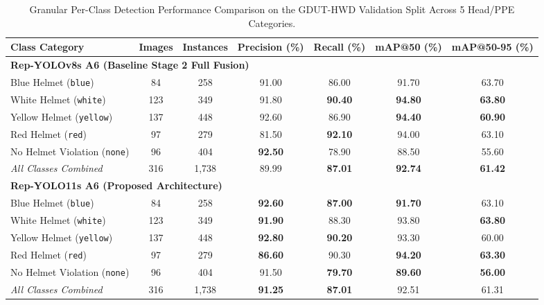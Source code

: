 \begin{table}[t]
\centering
\caption{Granular Per-Class Detection Performance Comparison on the GDUT-HWD Validation Split Across 5 Head/PPE Categories.}
\label{tab:gdut_per_class_benchmark}
\small
\begin{tabular*}{\textwidth}{@{\extracolsep{\fill}}lcccccc@{}}
\toprule
\textbf{Class Category} & \textbf{Images} & \textbf{Instances} & \textbf{Precision (\%)} & \textbf{Recall (\%)} & \textbf{mAP@50 (\%)} & \textbf{mAP@50-95 (\%)} \\
\midrule
\multicolumn{7}{l}{\textbf{Rep-YOLOv8s A6 (Baseline Stage 2 Full Fusion)}} \\
\quad Blue Helmet (\texttt{blue})    & 84  & 258 & 91.00 & 86.00 & 91.70 & 63.70 \\
\quad White Helmet (\texttt{white})  & 123 & 349 & 91.80 & \textbf{90.40} & \textbf{94.80} & \textbf{63.80} \\
\quad Yellow Helmet (\texttt{yellow})& 137 & 448 & 92.60 & 86.90 & \textbf{94.40} & \textbf{60.90} \\
\quad Red Helmet (\texttt{red})      & 97  & 279 & 81.50 & \textbf{92.10} & 94.00 & 63.10 \\
\quad No Helmet Violation (\texttt{none}) & 96 & 404 & \textbf{92.50} & 78.90 & 88.50 & 55.60 \\
\quad \textit{All Classes Combined}  & 316 & 1,738 & 89.99 & \textbf{87.01} & \textbf{92.74} & \textbf{61.42} \\
\midrule
\multicolumn{7}{l}{\textbf{Rep-YOLO11s A6 (Proposed Architecture)}} \\
\quad Blue Helmet (\texttt{blue})    & 84  & 258 & \textbf{92.60} & \textbf{87.00} & \textbf{91.70} & 63.10 \\
\quad White Helmet (\texttt{white})  & 123 & 349 & \textbf{91.90} & 88.30 & 93.80 & \textbf{63.80} \\
\quad Yellow Helmet (\texttt{yellow})& 137 & 448 & \textbf{92.80} & \textbf{90.20} & 93.30 & 60.00 \\
\quad Red Helmet (\texttt{red})      & 97  & 279 & \textbf{86.60} & 90.30 & \textbf{94.20} & \textbf{63.30} \\
\quad No Helmet Violation (\texttt{none}) & 96 & 404 & 91.50 & \textbf{79.70} & \textbf{89.60} & \textbf{56.00} \\
\quad \textit{All Classes Combined}  & 316 & 1,738 & \textbf{91.25} & \textbf{87.01} & 92.51 & 61.31 \\
\bottomrule
\end{tabular*}
\end{table}
